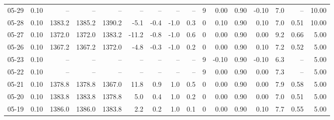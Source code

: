 \begin{threeparttable}
{\begin{tabular}{lrrrrrrrrrrrrrrr}
  05-29 &     0.10 &     -- &     -- &     -- &         -- &             -- &                       -- &                  -- &              9 &       0.00 &      0.90 &          -0.10 &              7.0 &              -- &                  10.00 \\
  05-28 &     0.10 & 1383.2 & 1385.2 & 1390.2 &       -5.1 &           -0.4 &                     -1.0 &                 0.3 &              0 &       0.10 &      0.90 &           0.10 &              7.0 &            0.51 &                  10.00 \\
  05-27 &     0.10 & 1372.0 & 1372.0 & 1383.2 &      -11.2 &           -0.8 &                     -1.0 &                 0.6 &              0 &       0.00 &      0.90 &           0.00 &              9.2 &            0.66 &                   5.00 \\
  05-26 &     0.10 & 1367.2 & 1367.2 & 1372.0 &       -4.8 &           -0.3 &                     -1.0 &                 0.2 &              0 &       0.00 &      0.90 &           0.10 &              7.2 &            0.52 &                   5.00 \\
  05-23 &     0.10 &     -- &     -- &     -- &         -- &             -- &                       -- &                  -- &              9 &      -0.10 &      0.90 &          -0.10 &              6.3 &              -- &                   5.00 \\
  05-22 &     0.10 &     -- &     -- &     -- &         -- &             -- &                       -- &                  -- &              9 &       0.00 &      0.90 &           0.00 &              7.3 &              -- &                   5.00 \\
  05-21 &     0.10 & 1378.8 & 1378.8 & 1367.0 &       11.8 &            0.9 &                      1.0 &                 0.5 &              0 &       0.00 &      0.90 &           0.00 &              7.9 &            0.58 &                   5.00 \\
  05-20 &     0.10 & 1383.8 & 1383.8 & 1378.8 &        5.0 &            0.4 &                      1.0 &                 0.2 &              0 &       0.00 &      0.90 &           0.00 &              7.0 &            0.51 &                   5.00 \\
  05-19 &     0.10 & 1386.0 & 1386.0 & 1383.8 &        2.2 &            0.2 &                      1.0 &                 0.1 &              0 &       0.00 &      0.90 &           0.10 &              7.7 &            0.55 &                   5.00 \\

\end{tabular}}
\end{threeparttable}
